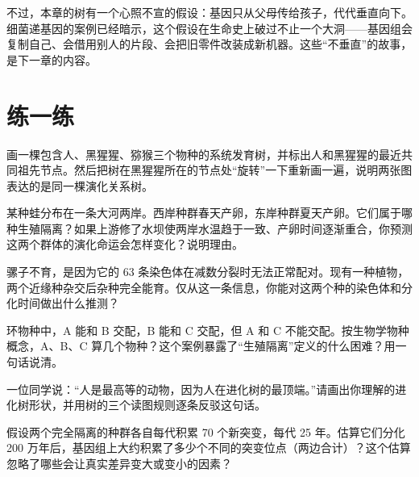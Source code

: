 不过，本章的树有一个心照不宣的假设：基因只从父母传给孩子，代代垂直向下。细菌递基因的案例已经暗示，这个假设在生命史上破过不止一个大洞——基因组会复制自己、会借用别人的片段、会把旧零件改装成新机器。这些“不垂直”的故事，是下一章的内容。

\section*{练一练}

\begin{sikaoti}
\item 画一棵包含人、黑猩猩、猕猴三个物种的系统发育树，并标出人和黑猩猩的最近共同祖先节点。然后把树在黑猩猩所在的节点处“旋转”一下重新画一遍，说明两张图表达的是同一棵演化关系树。
\item 某种蛙分布在一条大河两岸。西岸种群春天产卵，东岸种群夏天产卵。它们属于哪种生殖隔离？如果上游修了水坝使两岸水温趋于一致、产卵时间逐渐重合，你预测这两个群体的演化命运会怎样变化？说明理由。
\item 骡子不育，是因为它的 63 条染色体在减数分裂时无法正常配对。现有一种植物，两个近缘种杂交后杂种完全能育。仅从这一条信息，你能对这两个种的染色体和分化时间做出什么推测？
\item 环物种中，A 能和 B 交配，B 能和 C 交配，但 A 和 C 不能交配。按生物学物种概念，A、B、C 算几个物种？这个案例暴露了“生殖隔离”定义的什么困难？用一句话说清。
\item 一位同学说：“人是最高等的动物，因为人在进化树的最顶端。”请画出你理解的进化树形状，并用树的三个读图规则逐条反驳这句话。
\item 假设两个完全隔离的种群各自每代积累 70 个新突变，每代 25 年。估算它们分化 200 万年后，基因组上大约积累了多少个不同的突变位点（两边合计）？这个估算忽略了哪些会让真实差异变大或变小的因素？
\end{sikaoti}
